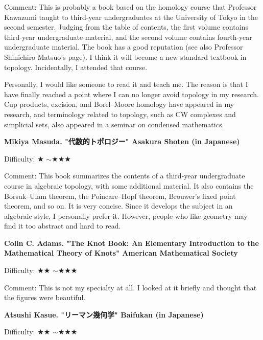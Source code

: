 Comment: This is probably a book based on the homology course that Professor Kawazumi taught to third-year undergraduates at the University of Tokyo in the second semester. Judging from the table of contents, the first volume contains third-year undergraduate material, and the second volume contains fourth-year undergraduate material. The book has a good reputation (see also Professor Shinichiro Matsuo's page). I think it will become a new standard textbook in topology. Incidentally, I attended that course.

Personally, I would like someone to read it and teach me. The reason is that I have finally reached a point where I can no longer avoid topology in my research. Cup products, excision, and Borel--Moore homology have appeared in my research, and terminology related to topology, such as CW complexes and simplicial sets, also appeared in a seminar on condensed mathematics.
\vspace{8pt}

\textbf{Mikiya Masuda. "代数的トポロジー" Asakura Shoten (in Japanese)}  　\vspace{-6pt} 

Difficulty: ★ $\sim$★★★\vspace{-6pt} 

Comment: This book summarizes the contents of a third-year undergraduate course in algebraic topology, with some additional material. It also contains the Borsuk--Ulam theorem, the Poincare--Hopf theorem, Brouwer's fixed point theorem, and so on. It is very concise. Since it develops the subject in an algebraic style, I personally prefer it. However, people who like geometry may find it too abstract and hard to read.
\vspace{8pt}

\textbf{Colin C. Adams. "The Knot Book: An Elementary Introduction to the Mathematical Theory of Knots" American Mathematical Society}  　\vspace{-6pt} 

Difficulty: ★★ $\sim$★★★\vspace{-6pt} 

Comment: This is not my specialty at all. I looked at it briefly and thought that the figures were beautiful.
\vspace{8pt}

\textbf{Atsushi Kasue. "リーマン幾何学" Baifukan (in Japanese)}  　\vspace{-6pt} 

Difficulty: ★★ $\sim$★★★\vspace{-6pt} 

